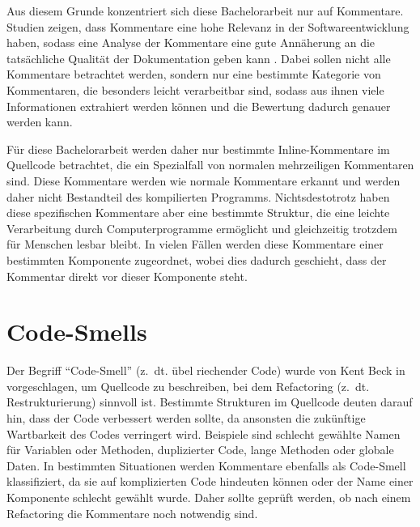 Aus diesem Grunde konzentriert sich diese Bachelorarbeit nur auf Kommentare. Studien zeigen, dass Kommentare eine hohe Relevanz in der Softwareentwicklung haben, sodass eine Analyse der Kommentare eine gute Annäherung an die tatsächliche Qualität der Dokumentation geben kann \cite[S. 71]{AStudyoftheDocumentationEssentialtoSoftwareMaintenance}. Dabei sollen nicht alle Kommentare betrachtet werden, sondern nur eine bestimmte Kategorie von Kommentaren, die besonders leicht verarbeitbar sind, sodass aus ihnen viele Informationen extrahiert werden können und die Bewertung dadurch genauer werden kann. 

Für diese Bachelorarbeit werden daher nur bestimmte Inline-Kommentare im Quellcode betrachtet, die ein Spezialfall von normalen mehrzeiligen Kommentaren sind.
Diese Kommentare werden wie normale Kommentare erkannt und werden daher nicht Bestandteil des kompilierten Programms. Nichtsdestotrotz haben diese spezifischen Kommentare aber eine bestimmte Struktur, die eine leichte Verarbeitung durch Computerprogramme ermöglicht und gleichzeitig trotzdem für Menschen lesbar bleibt. In vielen Fällen werden diese Kommentare einer bestimmten Komponente zugeordnet, wobei dies dadurch geschieht, dass der Kommentar direkt vor dieser Komponente steht. 

\section{Code-Smells}\label{chapter:code_smell}
Der Begriff \enquote{Code-Smell} (z.~dt. übel riechender Code)  wurde von Kent Beck in \cite[S. 71 ff.]{fowler2019refactoring}  vorgeschlagen, um Quellcode zu beschreiben, bei dem Refactoring (z.~dt. Restrukturierung) sinnvoll ist. Bestimmte Strukturen im Quellcode deuten darauf hin, dass der Code verbessert werden sollte, da ansonsten die zukünftige Wartbarkeit des Codes verringert wird. Beispiele sind schlecht gewählte Namen für Variablen oder Methoden, duplizierter Code, lange Methoden oder globale Daten. In bestimmten Situationen werden Kommentare ebenfalls als Code-Smell klassifiziert, da sie auf komplizierten  Code hindeuten können oder der Name einer Komponente schlecht gewählt wurde. Daher sollte geprüft werden, ob nach einem Refactoring die Kommentare noch notwendig sind.

